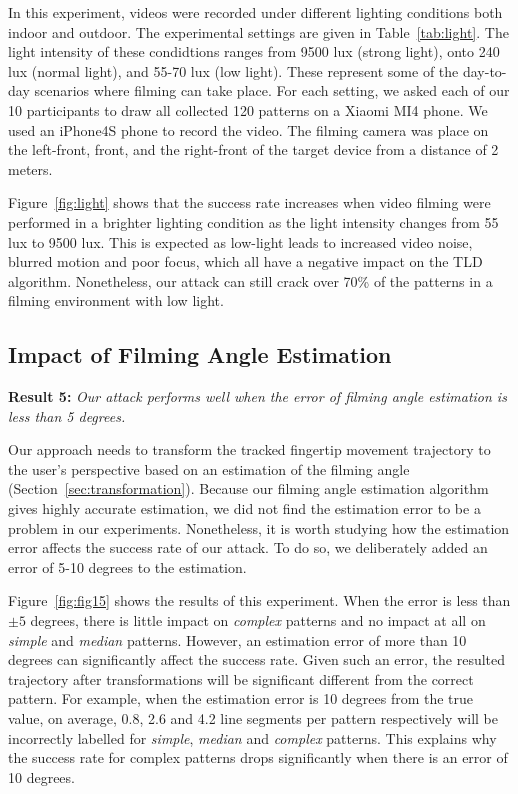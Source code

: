     In this experiment, videos were recorded under different lighting conditions both indoor and outdoor.
    The experimental settings are given in  Table~\ref{tab:light}.
    The light intensity of these condidtions ranges from 9500
    lux (strong light), onto 240 lux (normal light), and 55-70 lux (low light).
    These represent some of the day-to-day scenarios where filming can
    take place. For each setting, we asked each of our 10 participants to draw all collected 120 patterns on a Xiaomi MI4 phone. We used
    an iPhone4S phone to record the video. The filming camera was place on the
    left-front, front, and the right-front of the target device from a distance
    of 2 meters.


    Figure~\ref{fig:light} shows that the success rate increases when video filming were performed in a brighter lighting condition as the light intensity
    changes from 55 lux to 9500 lux. This is expected as low-light leads to
    increased video noise, blurred motion and poor focus, which all have a
    negative impact on the TLD algorithm. Nonetheless, our attack
    can still crack over 70\% of the patterns in a filming
    environment with low light.

    \subsection{Impact of Filming Angle Estimation \label{sec:angle}}

    \noindent \textbf{Result 5:} \emph{Our attack performs well when the error of filming angle estimation is less than 5 degrees.}

   Our approach needs to transform the tracked fingertip movement trajectory to the
   user's perspective based on an estimation of the filming angle
   (Section~\ref{sec:transformation}).
   Because our filming angle estimation
    algorithm gives highly accurate estimation, we did not find the estimation error to be a problem in our experiments.
   Nonetheless, it is worth studying how the estimation error affects the success rate of our attack. To do so, we deliberately added an error of 5-10 degrees to the estimation.

    Figure~\ref{fig:fig15} shows the results of this experiment. When the error is less than $\pm 5$ degrees, there is little impact
    on \emph{complex} patterns and no impact at all on \emph{simple} and
    \emph{median} patterns. However, an estimation error of more than 10 degrees can significantly affect the success rate.
    Given such an error, the resulted trajectory after transformations will
    be significant different from the correct pattern.
    For example, when the estimation error is 10 degrees from the
    true value,  on average, 0.8, 2.6 and 4.2 line segments per pattern respectively will
    be incorrectly labelled for \emph{simple}, \emph{median} and
    \emph{complex} patterns. This explains why the success rate for complex patterns drops significantly when there is
    an error of 10 degrees.

